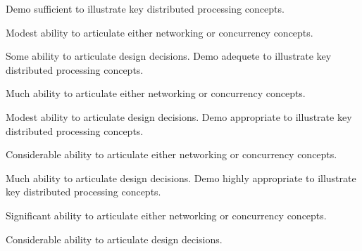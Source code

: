 \documentclass{../../../fal_assignment}
\begin{document}
\begin{markingrubric}
        \grade Demo sufficient to illustrate key distributed processing concepts.
            \par Modest ability to articulate either networking or concurrency concepts.
            \par Some ability to articulate design decisions.
        \grade Demo adequete to illustrate key distributed processing concepts.
            \par Much ability to articulate either networking or concurrency concepts.
            \par Modest ability to articulate design decisions.
        \grade Demo appropriate to illustrate key distributed processing concepts.
            \par Considerable ability to articulate either networking or concurrency concepts.
            \par Much ability to articulate design decisions.
        \grade Demo highly appropriate to illustrate key distributed processing concepts.
            \par Significant ability to articulate either networking or concurrency concepts.
            \par Considerable ability to articulate design decisions.
\end{markingrubric}
\end{document}
